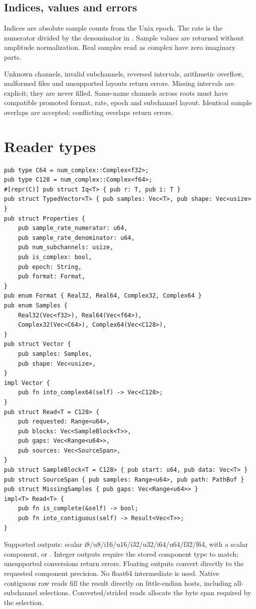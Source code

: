 \documentclass[10pt,a4paper]{article}
\newcommand{\api}[1]{\texttt{\detokenize{#1}}}
\begin{document}
\subsection*{Indices, values and errors}
Indices are absolute \api{u64} sample counts from the Unix epoch. The rate is
the numerator divided by the denominator in \api{Properties}.
Sample values are returned without amplitude normalization. Real samples read
as complex have zero imaginary parts.

Unknown channels, invalid subchannels, reversed intervals, arithmetic overflow,
malformed files and unsupported layouts return errors. Missing intervals are
explicit; they are never filled. Same-name channels across roots must have
compatible promoted format, rate, epoch and subchannel layout. Identical
sample overlaps are accepted; conflicting overlaps return errors.

\clearpage
\section*{Reader types}
\begin{lstlisting}
pub type C64 = num_complex::Complex<f32>;
pub type C128 = num_complex::Complex<f64>;
#[repr(C)] pub struct Iq<T> { pub r: T, pub i: T }
pub struct TypedVector<T> { pub samples: Vec<T>, pub shape: Vec<usize> }
pub struct Properties {
    pub sample_rate_numerator: u64,
    pub sample_rate_denominator: u64,
    pub num_subchannels: usize,
    pub is_complex: bool,
    pub epoch: String,
    pub format: Format,
}
pub enum Format { Real32, Real64, Complex32, Complex64 }
pub enum Samples {
    Real32(Vec<f32>), Real64(Vec<f64>),
    Complex32(Vec<C64>), Complex64(Vec<C128>),
}
pub struct Vector {
    pub samples: Samples,
    pub shape: Vec<usize>,
}
impl Vector {
    pub fn into_complex64(self) -> Vec<C128>;
}
pub struct Read<T = C128> {
    pub requested: Range<u64>,
    pub blocks: Vec<SampleBlock<T>>,
    pub gaps: Vec<Range<u64>>,
    pub sources: Vec<SourceSpan>,
}
pub struct SampleBlock<T = C128> { pub start: u64, pub data: Vec<T> }
pub struct SourceSpan { pub samples: Range<u64>, pub path: PathBuf }
pub struct MissingSamples { pub gaps: Vec<Range<u64>> }
impl<T> Read<T> {
    pub fn is_complete(&self) -> bool;
    pub fn into_contiguous(self) -> Result<Vec<T>>;
}
\end{lstlisting}
Supported outputs: scalar i8/u8/i16/u16/i32/u32/i64/u64/f32/f64,
\api{Iq<S>} with a scalar component, \api{C64} or \api{C128}. Integer outputs require the stored component type to
match; unsupported conversions return errors. Floating outputs convert directly
to the requested component precision. No float64 intermediate is used.
Native contiguous raw reads fill the result directly on little-endian
hosts, including all-subchannel selections. Converted/strided reads allocate the byte span required by the selection.
\end{document}
